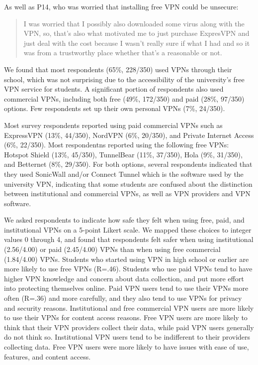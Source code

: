 As well as P14, who was worried that installing free VPN could be unsecure:
\begin{quote}I was worried that I possibly also downloaded some virus along
with the VPN, so, that's also what motivated me to just purchase ExpresVPN and
just deal with the cost because I wasn't really sure if what I had and so it
was from a trustworthy place whether that's a reasonable or not.\end{quote}

We found that most respondents (65\%, 228/350) used VPNs through their school,
which was not surprising due to the accessibility of the university’s free VPN
service for students. A significant portion of respondents also used
commercial VPNs, including both free (49\%, 172/350) and paid (28\%, 97/350)
options. Few respondents set up their own personal VPNs (7\%, 24/350).

Most survey respondents reported using paid commercial VPNs such as 
ExpressVPN (13\%, 44/350), NordVPN (6\%, 20/350), and Private Internet
Access (6\%, 22/350). Most respondentns reported using the following free VPNs: Hotspot Shield (13\%, 45/350), TunnelBear
(11\%, 37/350), Hola (9\%, 31/350), and Betternet (8\%, 29/350). For both
options, several respondents indicated that they used SonicWall and/or Connect
Tunnel which is the software used by the university VPN, indicating that some
students are confused about the distinction between institutional and
commercial VPNs, as well as VPN providers and VPN software.

We asked respondents to indicate how safe they felt when using free, paid, and
institutional VPNs on a 5-point Likert scale. We mapped these choices to
integer values 0 through 4, and found that respondents felt safer when using
institutional (2.56/4.00) or paid (2.45/4.00) VPNs than when using free
commercial (1.84/4.00) VPNs. Students who started using VPN in high school or
earlier are more likely to use free VPNs (R=.46). Students who use paid VPNs
tend to have higher VPN knowledge and concern about data collection, and put
more effort into protecting themselves online. Paid VPN users tend to use
their VPNs more often (R=.36) and more carefully, and they also tend to use
VPNs for privacy and security reasons. Institutional and free commercial VPN
users are more likely to use their VPNs for content access reasons. Free VPN
users are more likely to think that their VPN providers collect their data,
while paid VPN users generally do not think so. Institutional VPN users tend
to be indifferent to their providers collecting data. Free VPN users were more
likely to have issues with ease of use, features, and content access.

